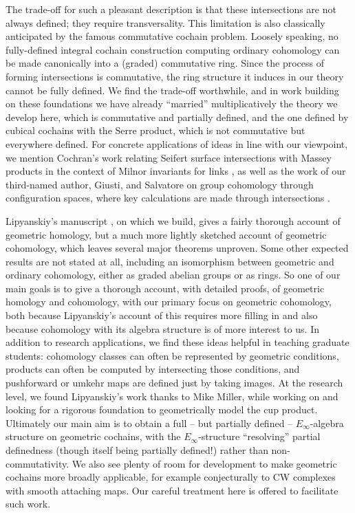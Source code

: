 The trade-off for such a pleasant description is that these intersections are not always defined; they require transversality.
This limitation is also classically anticipated by the famous commutative cochain problem.
Loosely speaking, no fully-defined integral cochain construction computing ordinary cohomology can be made canonically into a (graded) commutative ring.
Since the process of forming intersections is commutative, the ring structure it induces in our theory cannot be fully defined.
We find the trade-off worthwhile, and in work building on these foundations \cite{FMS-flows} we have already ``married'' multiplicatively the theory we develop here, which is commutative and partially defined, and the one defined by cubical cochains with the Serre product, which is not commutative but everywhere defined.
For concrete applications of ideas in line with our viewpoint, we mention Cochran's work relating Seifert surface intersections with Massey products in the context of Milnor invariants for links \cite{cochran1990milnor}, as well as the work of our third-named author, Giusti, and Salvatore on group cohomology through configuration spaces, where key calculations are made through intersections \cite{giusti2012symmetric, giusti2021alternating}.

Lipyanskiy's manuscript \cite{Lipy14}, on which we build, gives a fairly thorough account of geometric homology, but a much more lightly sketched account of geometric cohomology, which leaves several major theorems unproven.
Some other expected results are not stated at all, including an isomorphism between geometric and ordinary cohomology, either as graded abelian groups or as rings.
So one of our main goals is to give a thorough account, with detailed proofs, of geometric homology and cohomology, with our primary focus on geometric cohomology, both because Lipyanskiy's account of this requires more filling in and also because cohomology with its algebra structure is of more interest to us.
In addition to research applications, we find these ideas helpful in teaching graduate students: cohomology classes can often be represented by geometric conditions, products can often be computed by intersecting those conditions, and pushforward or umkehr maps are defined just by taking images.
At the research level, we found Lipyanskiy's work thanks to Mike Miller, while working on \cite{FMS-flows} and looking for a rigorous foundation to geometrically model the cup product.
Ultimately our main aim is to obtain a full -- but partially defined -- $E_\infty$-algebra structure on geometric cochains, with the $E_\infty$-structure ``resolving'' partial definedness (though itself being partially defined!) rather than non-commutativity.
We also see plenty of room for development to make geometric cochains more broadly applicable, for example conjecturally to CW complexes with smooth attaching maps.
Our careful treatment here is offered to facilitate such work.

